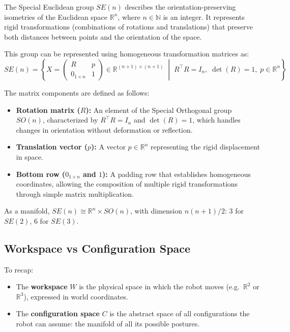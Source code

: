 \begin{nb}
The Special Euclidean group \( SE(n) \) describes the orientation-preserving isometries of the Euclidean space \( \mathbb{R}^n \), where \( n \in \mathbb{N} \) is an integer. It represents rigid transformations (combinations of rotations and translations) that preserve both distances between points and the orientation of the space.

This group can be represented using homogeneous transformation matrices as:
\[
SE(n) = \left\{ X = \begin{pmatrix} R & p \\ 0_{1 \times n} & 1 \end{pmatrix} \in \mathbb{R}^{(n+1) \times (n+1)} \;\middle|\; R^\top R = I_n, \; \det(R) = 1, \; p \in \mathbb{R}^n \right\}
\]

The matrix components are defined as follows:
\begin{itemize}
    \item \textbf{Rotation matrix (\( R \)):} An element of the Special Orthogonal group \( SO(n) \), characterized by \( R^\top R = I_n \) and \( \det(R) = 1 \), which handles changes in orientation without deformation or reflection.
    \item \textbf{Translation vector (\( p \)):} A vector \( p \in \mathbb{R}^n \) representing the rigid displacement in space.
    \item \textbf{Bottom row (\( 0_{1 \times n} \) and \( 1 \)):} A padding row that establishes homogeneous coordinates, allowing the composition of multiple rigid transformations through simple matrix multiplication.
\end{itemize}

As a manifold, \( SE(n) \cong \mathbb{R}^n \times SO(n) \), with
dimension \( n(n+1)/2 \): 3 for \( SE(2) \), 6 for \( SE(3) \).
\end{nb}

\subsection{Workspace vs Configuration Space}
\label{sec:workspace-vs-cspace}

To recap:

\begin{itemize}
    \item The \textbf{workspace} \( W \) is the physical space
          in which the robot moves (e.g.\ \( \mathbb{R}^2 \) or
          \( \mathbb{R}^3 \)), expressed in world coordinates.
    \item The \textbf{configuration space} \( C \) is the abstract space
          of all configurations the robot can assume: the manifold of
          all its possible postures.
\end{itemize}

